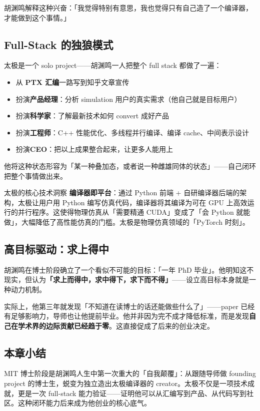 \documentclass[a4paper]{article}
\begin{document}
胡渊鸣解释这种兴奋：「我觉得特别有意思，我也觉得只有自己造了一个编译器，才能做到这个事情。」

\subsection{Full-Stack 的独狼模式}

太极是一个 solo project——胡渊鸣一人把整个 full stack 都做了一遍：

\begin{itemize}
    \item 从 \textbf{PTX 汇编}一路写到知乎文章宣传
    \item 扮演\textbf{产品经理}：分析 simulation 用户的真实需求（他自己就是目标用户）
    \item 扮演\textbf{科学家}：了解最新技术如何 convert 成好产品
    \item 扮演\textbf{工程师}：C++ 性能优化、多线程并行编译、编译 cache、中间表示设计
    \item 扮演\textbf{CEO}：把以上成果整合起来，让更多人能用上
\end{itemize}

他将这种状态形容为「某一种叠加态，或者说一种雌雄同体的状态」——自己闭环把整个事情做出来。

\begin{importantbox}{太极的核心技术洞察}
\textbf{编译器即平台}：通过 Python 前端 + 自研编译器后端的架构，太极让用户用 Python 编写仿真代码，编译器将其编译为可在 GPU 上高效运行的并行程序。这使得物理仿真从「需要精通 CUDA」变成了「会 Python 就能做」，大幅降低了高性能仿真的门槛。太极是物理仿真领域的「PyTorch 时刻」。
\end{importantbox}

\subsection{高目标驱动：求上得中}

胡渊鸣在博士阶段确立了一个看似不可能的目标：「一年 PhD 毕业」。他明知这不现实，但认为\textbf{「求上而得中，求中得下，求下而不得」}——设立高目标本身就是一种动力机制。

实际上，他第三年就发现「不知道在读博士的话还能做些什么了」——paper 已经有足够影响力，导师也让他提前毕业。他并非因为完不成才降低标准，而是发现\textbf{自己在学术界的边际贡献已经趋于零}。这直接促成了后来的创业决定。

\subsection{本章小结}
MIT 博士阶段是胡渊鸣人生中第一次重大的「自我颠覆」：从跟随导师做 founding project 的博士生，蜕变为独立造出太极编译器的 creator。太极不仅是一项技术成就，更是一次 full-stack 能力验证——证明他可以从汇编写到产品、从代码写到社区。这种闭环能力后来成为他创业的核心底气。
\end{document}
